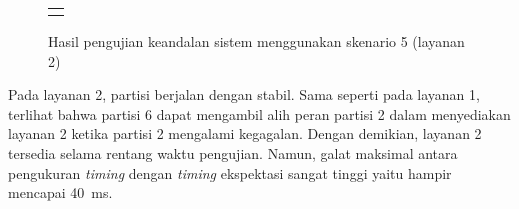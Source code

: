 \begin{enumerate}
\begin{figure}[!ht]
\begin{tabular}{c}
{\begin{tikzpicture}
\begin{axis}
								table[x=lastcall,y=error,col
								sep=comma]{./data/master-slave/schedule-4p-4b.json-random-failure.csv.xen-vm2};
							\addlegendentry{Partisi 2};
							\addplot[only marks, mark=+, mark size=2.0,color=red] %
								table[x=lastcall,y=error,col
								sep=comma]{./data/master-slave/schedule-4p-4b.json-random-failure.csv.xen-vm6};
							\addlegendentry{Partisi 6};
						\end{axis}
					\end{tikzpicture}
				}
			\end{tabular}
			\caption{Hasil pengujian keandalan sistem menggunakan skenario 5
			(layanan 2)}
			\label{figure:hasil_keandalan_s5_service2}
		\end{figure}

		Pada layanan 2, partisi berjalan dengan stabil. Sama seperti pada layanan 1,
		terlihat bahwa partisi 6 dapat mengambil alih peran partisi 2 dalam menyediakan
		layanan 2 ketika partisi 2 mengalami kegagalan. Dengan demikian, layanan 2
		tersedia selama rentang waktu pengujian. Namun, galat maksimal antara pengukuran
		\textit{timing} dengan \textit{timing} ekspektasi sangat tinggi yaitu hampir
		mencapai \SI{40}{\milli\second}.


\end{enumerate}
